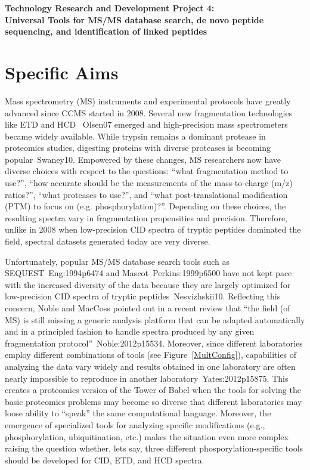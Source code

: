 
{\Large \bf{Technology Research and Development Project 4: \\ Universal  Tools for 
 MS/MS database search, de novo peptide sequencing, and
identification of linked peptides} }


\section{Specific Aims}

Mass spectrometry (MS) instruments and experimental protocols have
greatly advanced since CCMS started in 2008. Several new fragmentation technologies
like ETD
and HCD
~\cite{unv}{Olsen07} 
emerged and high-precision mass spectrometers
became widely
available.  While trypsin remains a dominant protease in proteomics studies, digesting proteins with diverse  proteases is becoming popular~\cite{unv}{Swaney10}.
Empowered by these changes, MS researchers now have diverse choices with respect to the questions:  ``what fragmentation
method to use?'', ``how accurate should be the measurements of the mass-to-charge (m/z) ratios?'', ``what proteases
to use?'', and ``what post-translational modification (PTM) to focus on (e.g. phosphorylation)?''. 
Depending on these choices, the resulting spectra vary in fragmentation propensities and
precision.
Therefore, 
unlike in 2008 when low-precision CID spectra of tryptic peptides  dominated the field,
spectral datasets  generated today are very diverse.




Unfortunately, popular MS/MS database search tools such as SEQUEST~\cite{unv}{Eng:1994p6474} and Mascot~\cite{unv}{Perkins:1999p6500} have not kept pace with the increased diversity of the data 
because they are largely optimized for low-precision CID spectra of tryptic peptides~\cite{unv}{Nesvizhskii10}.
Reflecting this concern, Noble and MacCoss pointed out in a recent review that
``the field (of MS) is still missing a generic analysis platform that can be adapted automatically and in a principled fashion to handle spectra produced by any given fragmentation protocol''~\cite{unv}{Noble:2012p15534}.
 Moreover, since different laboratories employ
different combinations of tools (see Figure~\ref{MultConfig}), 
capabilities of analyzing the data vary widely
and results obtained in one laboratory are often nearly impossible to reproduce in another laboratory~\cite{unv}{Yates:2012p15875}. 
This creates a proteomics version of the Tower of Babel when the tools for solving the basic proteomics problems may become so diverse that different laboratories may loose ability to ``speak'' the same computational language. Moreover, the emergence of specialized tools for analyzing specific modifications (e.g., phosphorylation, ubiquitination, etc.) makes the situation even more complex raising the question whether, lets say, three different phosporylation-specific tools should be developed for CID, ETD, and HCD spectra. 


